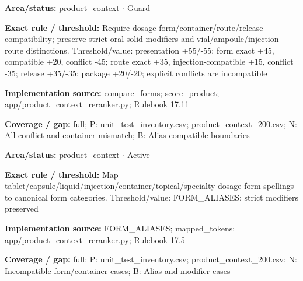\begin{tcolorbox}[enhanced,breakable,colback=white,colframe=Muted!45,boxrule=0.45pt,arc=1.5pt,left=6pt,right=6pt,top=5pt,bottom=5pt,title={\texttt{PC-COMPATIBILITY-13}},title after break={\texttt{PC-COMPATIBILITY-13}\ (continued)},fonttitle=\headingfont\bfseries\color{Navy},coltitle=Navy]
\textbf{Area/status:} product\_\allowbreak{}context $\boldsymbol{\cdot}$ Guard\par
\smallskip
\textbf{Exact rule / threshold:} Require dosage form/\allowbreak{}container/\allowbreak{}route/\allowbreak{}release compatibility; preserve strict oral-solid modifiers and vial/\allowbreak{}ampoule/\allowbreak{}injection route distinctions. Threshold/\allowbreak{}value: presentation +55/\allowbreak{}-55; form exact +45, compatible +20, conflict -45; route exact +35, injection-compatible +15, conflict -35; release +35/\allowbreak{}-35; package +20/\allowbreak{}-20; explicit conflicts are incompatible\par
\smallskip
\textbf{Implementation source:} compare\_\allowbreak{}forms; score\_\allowbreak{}product; app/\allowbreak{}product\_\allowbreak{}context\_\allowbreak{}reranker.py; Rulebook 17.11\par
\smallskip
\textbf{Coverage / gap:} full; P: unit\_\allowbreak{}test\_\allowbreak{}inventory.csv; product\_\allowbreak{}context\_\allowbreak{}200.csv; N: All-conflict and container mismatch; B: Alias-compatible boundaries
\end{tcolorbox}
\begin{tcolorbox}[enhanced,breakable,colback=white,colframe=Muted!45,boxrule=0.45pt,arc=1.5pt,left=6pt,right=6pt,top=5pt,bottom=5pt,title={\texttt{PC-FORM-ALIASES-06}},title after break={\texttt{PC-FORM-ALIASES-06}\ (continued)},fonttitle=\headingfont\bfseries\color{Navy},coltitle=Navy]
\textbf{Area/status:} product\_\allowbreak{}context $\boldsymbol{\cdot}$ Active\par
\smallskip
\textbf{Exact rule / threshold:} Map tablet/\allowbreak{}capsule/\allowbreak{}liquid/\allowbreak{}injection/\allowbreak{}container/\allowbreak{}topical/\allowbreak{}specialty dosage-form spellings to canonical form categories. Threshold/\allowbreak{}value: FORM\_\allowbreak{}ALIASES; strict modifiers preserved\par
\smallskip
\textbf{Implementation source:} FORM\_\allowbreak{}ALIASES; mapped\_\allowbreak{}tokens; app/\allowbreak{}product\_\allowbreak{}context\_\allowbreak{}reranker.py; Rulebook 17.5\par
\smallskip
\textbf{Coverage / gap:} full; P: unit\_\allowbreak{}test\_\allowbreak{}inventory.csv; product\_\allowbreak{}context\_\allowbreak{}200.csv; N: Incompatible form/\allowbreak{}container cases; B: Alias and modifier cases
\end{tcolorbox}
